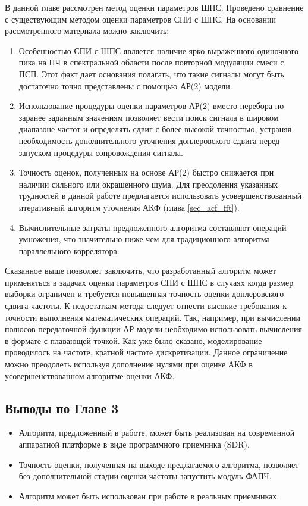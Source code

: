 В данной главе рассмотрен метод оценки параметров ШПС. Проведено сравнение с существующим методом оценки параметров СПИ с ШПС. На основании рассмотренного материала можно заключить:
\begin{enumerate}
\item Особенностью СПИ с ШПС является наличие ярко выраженного одиночного пика на ПЧ в спектральной области после повторной модуляции смеси с ПСП.
	Этот факт дает основания полагать, что такие сигналы могут быть достаточно точно представлены с помощью АР(2) модели.
\item Использование процедуры оценки параметров АР(2) вместо перебора по заранее заданным значениям позволяет вести поиск сигнала в широком диапазоне частот и определять сдвиг
	с более высокой точностью, устраняя необходимость дополнительного уточнения доплеровского сдвига перед запуском процедуры сопровождения сигнала.
\item Точность оценок, полученных на основе АР(2) быстро снижается при наличии сильного или окрашенного шума. Для преодоления указанных трудностей в 
	данной работе предлагается использовать усовершенствованный итеративный алгоритм уточнения АКФ (глава \ref{sec_acf_fft}).
\item Вычислительные затраты предложенного алгоритма составляют   операций умножения, что значительно ниже чем   для традиционного алгоритма параллельного коррелятора.
\end{enumerate}

Сказанное выше позволяет заключить, что разработанный алгоритм может применяться в задачах оценки параметров СПИ с ШПС в случаях когда размер выборки ограничен и
требуется повышенная точность оценки доплеровского сдвига частоты. К недостаткам метода следует отнести высокие требования к точности выполнения математических операций.
Так, например, при вычислении полюсов передаточной функции АР модели необходимо использовать вычисления в формате с плавающей точкой. 
Как уже было сказано, моделирование проводилось на частоте, кратной частоте дискретизации. Данное ограничение можно преодолеть используя дополнение нулями при оценке АКФ
в усовершенствованном алгоритме оценки АКФ.

\subsection{Выводы по Главе 3}

\begin{itemize}
\item Алгоритм, предложенный в работе, может быть реализован на современной аппаратной платформе в виде программного приемника (SDR). 
\item Точность оценки, полученная на выходе предлагаемого алгоритма, позволяет без дополнительной стадии оценки частоты запустить модуль ФАПЧ.
\item Алгоритм может быть использован при работе в реальных приемниках.
\end{itemize}

\clearpage
